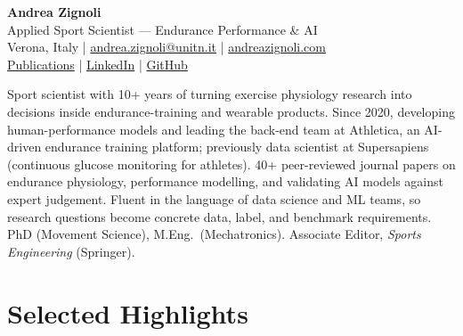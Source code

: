 \documentclass[10pt,a4paper]{article}
\begin{document}
\begin{center}
  {\LARGE\bfseries Andrea Zignoli}\\[3pt]
  {\large Applied Sport Scientist — Endurance Performance \& AI}\\[5pt]
  {\small
    Verona, Italy \quad|\quad
    \href{mailto:andrea.zignoli@unitn.it}{andrea.zignoli@unitn.it} \quad|\quad
    \href{https://andreazignoli.com}{andreazignoli.com} \\[2pt]
    \href{https://andreazignoli.github.io/publications/}{Publications} \quad|\quad
    \href{https://linkedin.com/in/andrea-zignoli-8080a438}{LinkedIn} \quad|\quad
    \href{https://github.com/andreazignoli}{GitHub}
  }
\end{center}
\vspace{4pt}

{\small Sport scientist with 10+ years of turning exercise physiology research into decisions inside endurance-training and wearable products. Since 2020, developing human-performance models and leading the back-end team at Athletica, an AI-driven endurance training platform; previously data scientist at Supersapiens (continuous glucose monitoring for athletes). 40+ peer-reviewed journal papers on endurance physiology, performance modelling, and validating AI models against expert judgement. Fluent in the language of data science and ML teams, so research questions become concrete data, label, and benchmark requirements. PhD (Movement Science), M.Eng.\ (Mechatronics). Associate Editor, \textit{Sports Engineering} (Springer).}

\section{Selected Highlights}
\end{document}
